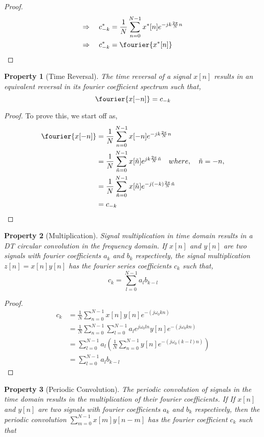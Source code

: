 \documentclass{home_assignment}
\newtheorem{theorem}{Property}
\begin{document}
{\begin{proof}
$$\begin{aligned}
\Rightarrow \quad c^*_{-k}&=\frac{1}{N}\sum_{n=0}^{N-1}x^*[n]e^{-jk\frac{2\pi}{N}n}\\
\Rightarrow \quad c^*_{-k}&=\fourier{x^*[n]}
\end{aligned}
$$
\end{proof}
\begin{theorem}[Time Reversal]
The time reversal of a signal $x[n]$ results in an equivalent reversal in its fourier coefficient spectrum such that,
$$
\fourier{x[-n]}=c_{-k}
$$
\end{theorem}
\begin{proof}
To prove this, we start off as,
$$
\begin{aligned}
\fourier{x[-n]}&=\frac{1}{N}\sum_{n=0}^{N-1}x[-n]e^{-jk\frac{2\pi}{N}n}\\
&=\frac{1}{N}\sum_{\tilde{n}=0}^{N-1}x[\tilde{n}]e^{jk\frac{2\pi}{N}\tilde{n}}\quad where,\quad \tilde{n}=-n,\\
&=\frac{1}{N}\sum_{\tilde{n}=0}^{N-1}x[\tilde{n}]e^{-j(-k)\frac{2\pi}{N}\tilde{n}}\\
&=c_{-k}
\end{aligned}
$$
\end{proof}
\begin{theorem}[Multiplication]
Signal multiplication in time domain results in a DT circular convolution in the frequency domain. If $x[n]$ and $y[n]$ are two signals with fourier coefficients $a_k$ and $b_k$ respectively, the signal multiplication $z[n]=x[n]y[n]$ has the fourier series coefficients $c_k$ such that,
$$c_k=\sum_{l=0}^{N-1} a_{l} b_{k-l}
$$
\end{theorem}
\begin{proof}
$$\begin{aligned}
c_{k} &=\frac{1}{N} \sum_{n=0}^{N-1} x[n] y[n] e^{-\left(j \omega_{0} k n\right)} \\ 
&=\frac{1}{N} \sum_{n=0}^{N-1} \sum_{l=0}^{N-1} a_{l} e^{j \omega_{0} l n} y[n] e^{-\left(j \omega_{0} k n\right)}\\ 
&=\sum_{l=0}^{N-1} a_{l}\left(\frac{1}{N} \sum_{n=0}^{N-1} y[n] e^{-\left(j \omega_{0}(k-l) n\right)}\right) \\ 
&=\sum_{l=0}^{N-1} a_{l} b_{k-l} 
\end{aligned} $$
\enlargethispage{\baselineskip}
\end{proof}
\begin{theorem}[Periodic Convolution]
The periodic convolution of signals in the time domain results in the multiplication of their fourier coefficients. If If $x[n]$ and $y[n]$ are two signals with fourier coefficients $a_k$ and $b_k$ respectively, then the periodic convolution $\sum_{m=0}^{N-1}x[m]y[n-m]$ has the fourier coefficient $c_k$ such that

\end{theorem}}
\end{document}
